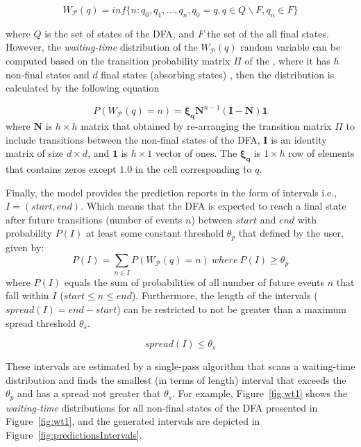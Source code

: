 \begin{equation*}
W_{\mathcal{P}}(q)=inf\{n: q_{0},q_{1},...,q_{n}, q_{0}=q, q \in Q \backslash F, q_{n} \in F\}
\end{equation*}

where $Q$ is the set of states of the DFA, and $F$ the set of the  all final states. However, the \textit{waiting-time} distribution of the $W_{\mathcal{P}}(q)$ random variable can be computed based on the transition probability matrix $\Pi$ of the \pmcmr, where it has $h$ non-final states and $d$ final states (absorbing states) \cite{alevizos2017event}, then the distribution is calculated by the following equation 

\begin{equation*}
P(W_{\mathcal{P}}(q)=n)=\boldsymbol{\xi_{q}}\boldsymbol{N}^{n-1}(\boldsymbol{I}-\boldsymbol{N})\boldsymbol{1}
\end{equation*}
where $\boldsymbol{N}$ is $h \times h$ matrix that obtained by re-arranging the transition matrix $\Pi$ to include transitions between the non-final states of the DFA, $\boldsymbol{I}$ is an identity matrix of size $d \times d$, and  $\boldsymbol{1}$ is $h \times 1$ vector of ones. The $\boldsymbol{\xi_{q}}$ is $1 \times h$ row of elements that contains zeros except $1.0$ in the cell corresponding to $q$. 
\par Finally, the model provides the prediction reports in the form of intervals i.e.,  $I=(\mathit{start},\mathit{end})$. Which means that the DFA is expected to reach a final state  after future transitions (number of events $n$) between $\mathit{start}$ and $\mathit{end}$ with probability $P(I)$ at least some constant threshold $\theta_{p}$ that defined by the user, given by:
\begin{equation*}
P(I)=\sum_{n \in I}{P(W_{\mathcal{P}}(q)=n)}\ where\  P(I) \geq \theta_{p} 
\end{equation*}
where $P(I)$ equals the sum of probabilities of all number of future events $n$ that fall within $I$ ($start\leq n\leq end$). Furthermore, the length of the intervals ($spread(I) = end - start$)  can be restricted to not be greater than a maximum spread threshold $\theta_{s}$.  

\begin{equation*}
spread(I)\leq \theta_{s}
\end{equation*}

These intervals are estimated by a single-pass algorithm that scans a waiting-time distribution and finds the smallest (in terms of length) interval that exceeds the $\theta_{p}$ and has a spread  not greater that $\theta_{s}$. For example, Figure~\ref{fig:wt1} shows the \textit{waiting-time} distributions for all non-final states of the DFA presented in Figure~\ref{fig:wt1}, and the generated intervals are depicted in Figure~\ref{fig:predictionsIntervals}.


